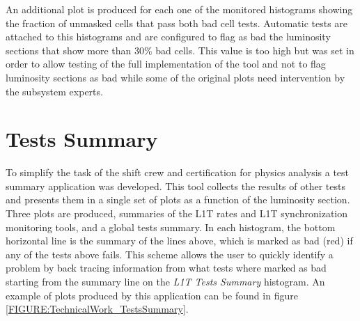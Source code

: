 An additional plot is produced for each one of the monitored histograms showing the fraction of unmasked cells that pass both bad cell tests. Automatic tests are attached to this histograms and are configured to flag as bad the luminosity sections that show more than 30\% bad cells. This value is too high but was set in order to allow testing of the full implementation of the tool and not to flag luminosity sections as bad while some of the original plots need intervention by the subsystem experts.

\section{Tests Summary}


To simplify the task of the shift crew and certification for physics analysis a test summary application was developed. This tool collects the results of other tests and presents them in a single set of plots as a function of the luminosity section. Three plots are produced, summaries of the \gls{L1T} rates and \gls{L1T} synchronization monitoring tools, and a global tests summary. In each histogram, the bottom horizontal line is the summary of the lines above, which is marked as bad (red) if any of the tests above fails. This scheme allows the user to quickly identify a problem by back tracing information from what tests where marked as bad starting from the summary line on the \textit{L1T Tests Summary} histogram. An example of plots produced by this application can be found in figure \ref{FIGURE:TechnicalWork_TestsSummary}.

